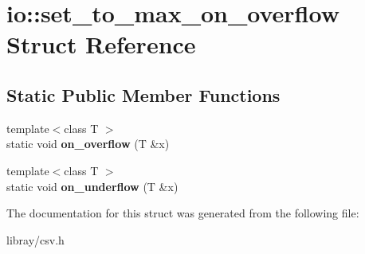 \hypertarget{structio_1_1set__to__max__on__overflow}{}\section{io\+:\+:set\+\_\+to\+\_\+max\+\_\+on\+\_\+overflow Struct Reference}
\label{structio_1_1set__to__max__on__overflow}
\subsection*{Static Public Member Functions}
\begin{DoxyCompactItemize}
\item 
\mbox{\label{structio_1_1set__to__max__on__overflow_a770dee97a1ee55131163e6be8d4c0d9d}} 
{\footnotesize template$<$class T $>$ }\\static void {\bfseries on\+\_\+overflow} (T \&x)
\item 
\mbox{\label{structio_1_1set__to__max__on__overflow_a812d316e2b23247df19ca83bfda90a59}} 
{\footnotesize template$<$class T $>$ }\\static void {\bfseries on\+\_\+underflow} (T \&x)
\end{DoxyCompactItemize}


The documentation for this struct was generated from the following file\+:\begin{DoxyCompactItemize}
\item 
libray/csv.\+h\end{DoxyCompactItemize}
